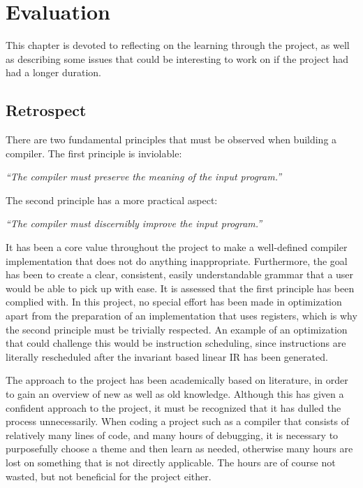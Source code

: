 \chapter{Evaluation}
This chapter is devoted to reflecting on the learning through the project, as well as describing some issues that could be interesting to work on if the project had had a longer duration.

\section{Retrospect}
There are two fundamental principles that must be observed when building a compiler. The first principle is inviolable:

\begin{displayquote}
    \textit{``The compiler must preserve the meaning of the input program.''}
\end{displayquote}
\hspace*{}

The second principle has a more practical aspect:

\begin{displayquote}
    \textit{``The compiler must discernibly improve the input program.''}
\end{displayquote}
\hspace*{}

It has been a core value throughout the project to make a well-defined compiler implementation that does not do anything inappropriate. Furthermore, the goal has been to create a clear, consistent, easily understandable grammar that a user would be able to pick up with ease. It is assessed that the first principle has been complied with. In this project, no special effort has been made in optimization apart from the preparation of an implementation that uses registers, which is why the second principle must be trivially respected. An example of an optimization that could challenge this would be instruction scheduling, since instructions are literally rescheduled after the invariant based linear IR has been generated.

The approach to the project has been academically based on literature, in order to gain an overview of new as well as old knowledge. Although this has given a confident approach to the project, it must be recognized that it has dulled the process unnecessarily. When coding a project such as a compiler that consists of relatively many lines of code, and many hours of debugging, it is necessary to purposefully choose a theme and then learn as needed, otherwise many hours are lost on something that is not directly applicable. The hours are of course not wasted, but not beneficial for the project either.

